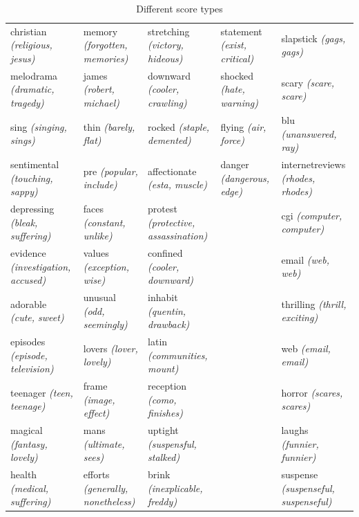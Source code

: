 {\begin{landscape}
\begin{table}[]
\begin{tabular}{lllll}
			christian \textit{(religious, jesus)}      & memory \textit{(forgotten, memories)}     & stretching \textit{(victory, hideous)}           & statement \textit{(exist, critical)}        & slapstick \textit{(gags, gags)}               \\
			melodrama \textit{(dramatic, tragedy)}     & james \textit{(robert, michael)}          & downward \textit{(cooler, crawling)}             & shocked \textit{(hate, warning)}            & scary \textit{(scare, scare)}                 \\
			sing \textit{(singing, sings)}             & thin \textit{(barely, flat)}              & rocked \textit{(staple, demented)}               & flying \textit{(air, force)}                & blu \textit{(unanswered, ray)}                \\
			sentimental \textit{(touching, sappy)}     & pre \textit{(popular, include)}           & affectionate \textit{(esta, muscle)}             & danger \textit{(dangerous, edge)}           & internetreviews \textit{(rhodes, rhodes)}     \\
			depressing \textit{(bleak, suffering)}     & faces \textit{(constant, unlike)}         & protest \textit{(protective, assassination)}     &                                    & cgi \textit{(computer, computer)}             \\
			evidence \textit{(investigation, accused)} & values \textit{(exception, wise)}         & confined \textit{(cooler, downward)}             &                                    & email \textit{(web, web)}                     \\
			adorable \textit{(cute, sweet)}            & unusual \textit{(odd, seemingly)}         & inhabit \textit{(quentin, drawback)}             &                                    & thrilling \textit{(thrill, exciting)}         \\
			episodes \textit{(episode, television)}    & lovers \textit{(lover, lovely)}           & latin \textit{(communities, mount)}              &                                    & web \textit{(email, email)}                   \\
			teenager \textit{(teen, teenage)}          & frame \textit{(image, effect)}            & reception \textit{(como, finishes)}              &                                    & horror \textit{(scares, scares)}              \\
			magical \textit{(fantasy, lovely)}         & mans \textit{(ultimate, sees)}            & uptight \textit{(suspensful, stalked)}           &                                    & laughs \textit{(funnier, funnier)}            \\
			health \textit{(medical, suffering)}       & efforts \textit{(generally, nonetheless)} & brink \textit{(inexplicable, freddy)}            &                                    & suspense \textit{(suspenseful, suspenseful)} 
		\end{tabular}
		\caption{Different score types}\label{ch3:scoringtypes}
	\end{table}
\end{landscape}
}
